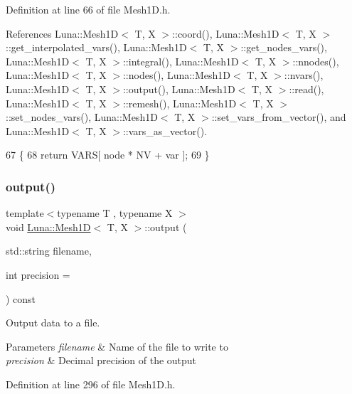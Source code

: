 Definition at line 66 of file Mesh1\+D.\+h.



References Luna\+::\+Mesh1\+D$<$ T, X $>$\+::coord(), Luna\+::\+Mesh1\+D$<$ T, X $>$\+::get\+\_\+interpolated\+\_\+vars(), Luna\+::\+Mesh1\+D$<$ T, X $>$\+::get\+\_\+nodes\+\_\+vars(), Luna\+::\+Mesh1\+D$<$ T, X $>$\+::integral(), Luna\+::\+Mesh1\+D$<$ T, X $>$\+::nnodes(), Luna\+::\+Mesh1\+D$<$ T, X $>$\+::nodes(), Luna\+::\+Mesh1\+D$<$ T, X $>$\+::nvars(), Luna\+::\+Mesh1\+D$<$ T, X $>$\+::output(), Luna\+::\+Mesh1\+D$<$ T, X $>$\+::read(), Luna\+::\+Mesh1\+D$<$ T, X $>$\+::remesh(), Luna\+::\+Mesh1\+D$<$ T, X $>$\+::set\+\_\+nodes\+\_\+vars(), Luna\+::\+Mesh1\+D$<$ T, X $>$\+::set\+\_\+vars\+\_\+from\+\_\+vector(), and Luna\+::\+Mesh1\+D$<$ T, X $>$\+::vars\+\_\+as\+\_\+vector().


\begin{DoxyCode}
67     \{
68       \textcolor{keywordflow}{return} VARS[ node * NV + var ];
69     \}
\end{DoxyCode}
\mbox{\label{classLuna_1_1Mesh1D_a4151177f59bac4391ca951af8c7e14e4}} 
\subsubsection{\texorpdfstring{output()}{output()}}
{\footnotesize\ttfamily template$<$typename T , typename X $>$ \\
void \hyperlink{classLuna_1_1Mesh1D}{Luna\+::\+Mesh1D}$<$ T, X $>$\+::output (\begin{DoxyParamCaption}\item[{std\+::string}]{filename,  }\item[{int}]{precision = {} }\end{DoxyParamCaption}) const\hspace{0.3cm}{\ttfamily [inline]}}



Output data to a file. 


\begin{DoxyParams}{Parameters}
{\em filename} & Name of the file to write to \\
\hline
{\em precision} & Decimal precision of the output \\
\hline
\end{DoxyParams}


Definition at line 296 of file Mesh1\+D.\+h.



